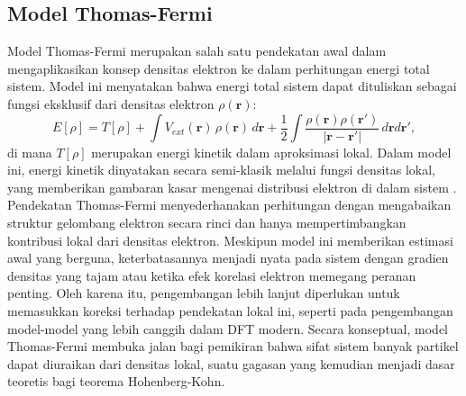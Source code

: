 \subsection{Model Thomas-Fermi}
Model Thomas-Fermi merupakan salah satu pendekatan awal dalam mengaplikasikan konsep densitas elektron ke dalam perhitungan energi total sistem.
Model ini menyatakan bahwa energi total sistem dapat dituliskan sebagai fungsi eksklusif dari densitas elektron \(\rho(\mathbf{r})\):
\begin{equation}
    E[\rho] = T[\rho] + \int V_{ext}(\mathbf{r})\,\rho(\mathbf{r})\,d\mathbf{r} + \frac{1}{2}\int \frac{\rho(\mathbf{r})\rho(\mathbf{r'})}{|\mathbf{r}-\mathbf{r'}|}\, d\mathbf{r}d\mathbf{r'},
\end{equation}
di mana \(T[\rho]\) merupakan energi kinetik dalam aproksimasi lokal.
Dalam model ini, energi kinetik dinyatakan secara semi-klasik melalui fungsi densitas lokal, yang memberikan gambaran kasar mengenai distribusi elektron di dalam sistem \citep{Martin2004}.
Pendekatan Thomas-Fermi menyederhanakan perhitungan dengan mengabaikan struktur gelombang elektron secara rinci dan hanya mempertimbangkan kontribusi lokal dari densitas elektron.
Meskipun model ini memberikan estimasi awal yang berguna, keterbatasannya menjadi nyata pada sistem dengan gradien densitas yang tajam atau ketika efek korelasi elektron memegang peranan penting.
Oleh karena itu, pengembangan lebih lanjut diperlukan untuk memasukkan koreksi terhadap pendekatan lokal ini, seperti pada pengembangan model-model yang lebih canggih dalam DFT modern.
Secara konseptual, model Thomas-Fermi membuka jalan bagi pemikiran bahwa sifat sistem banyak partikel dapat diuraikan dari densitas lokal, suatu gagasan yang kemudian menjadi dasar teoretis bagi teorema Hohenberg-Kohn.

